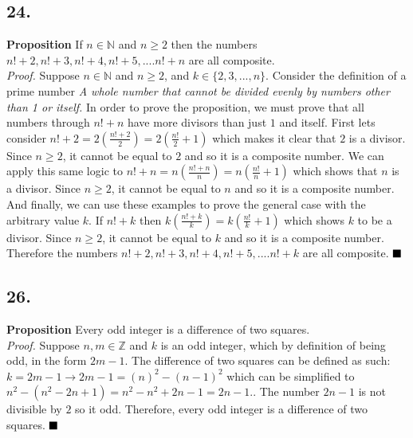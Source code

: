 \documentclass[12pt]{article}
\begin{document}
\begin{minipage}[t]{0.45\textwidth}

	
\subsection*{24.}
\textbf{Proposition} If $ n \in\mathbb{N} $ and $ n\geq 2 $ then the numbers $ n!+2, n!+3, n!+4, n!+5,....n!+n $ are all composite.\\
\textit{Proof.}
Suppose $ n \in\mathbb{N} $ and $ n\geq 2 $, and $ k\in\{2, 3,..., n\} $. Consider the definition of a prime number \textit{A whole number that cannot be divided evenly by numbers other than 1 or itself.} In order to prove the proposition, we must prove that all numbers through $ n!+n $ have more divisors than just $ 1 $ and itself. First lets consider $ n!+2 =2(\frac{n!+2}{2})=2(\frac{n!}{2}+1) $ which makes it clear that $ 2 $ is a divisor. Since $ n\geq 2 $, it cannot be equal to $ 2 $ and so it is a composite number. We can apply this same logic to $ n!+n =n(\frac{n!+n}{n})=n(\frac{n!}{n}+1) $ which shows that $ n $ is a divisor. Since $ n\geq 2 $, it cannot be equal to $ n $ and so it is a composite number. And finally, we can use these examples to prove the general case with the arbitrary value $ k $. If $ n!+k $ then $ k(\frac{n!+k}{k})=k(\frac{n!}{k}+1) $ which shows $ k $ to be a divisor. Since $ n\geq 2 $, it cannot be equal to $ k $ and so it is a composite number. Therefore the numbers $ n!+2, n!+3, n!+4, n!+5,....n!+k $ are all composite.
$\hfill\blacksquare$

\subsection*{26.}
\textbf{Proposition} Every odd integer is a difference of two squares.\\
\textit{Proof.} Suppose $ n,m\in\mathbb{Z} $ and $ k $ is an odd integer, which by definition of being odd, in the form $ 2m-1 $. The difference of two squares can be defined as such: $ k=2m-1\rightarrow 2m-1=(n)^2-(n-1)^2 $ which can be simplified to $ n^2-(n^2-2n+1)=n^2-n^2+2n-1=2n-1. $. The number $ 2n-1 $ is not divisible by $ 2 $ so it odd. Therefore, every odd integer is a difference of two squares.
$\hfill\blacksquare$

\end{minipage}
\pagebreak


\end{document}

